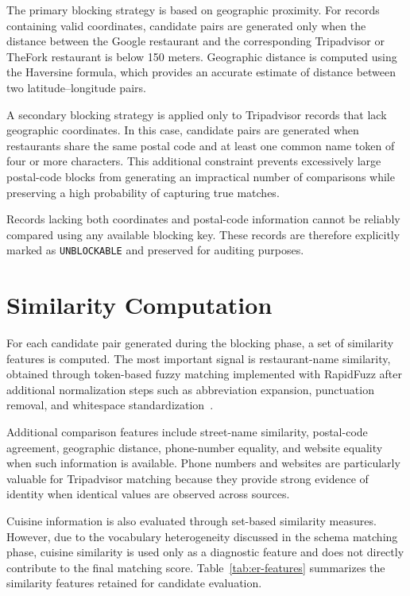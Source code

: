 The primary blocking strategy is based on geographic proximity. For records containing valid coordinates, candidate pairs are generated only when the distance between the Google restaurant and the corresponding Tripadvisor or TheFork restaurant is below 150 meters. Geographic distance is computed using the Haversine formula, which provides an accurate estimate of distance between two latitude--longitude pairs.

A secondary blocking strategy is applied only to Tripadvisor records that lack geographic coordinates. In this case, candidate pairs are generated when restaurants share the same postal code and at least one common name token of four or more characters. This additional constraint prevents excessively large postal-code blocks from generating an impractical number of comparisons while preserving a high probability of capturing true matches.

Records lacking both coordinates and postal-code information cannot be reliably compared using any available blocking key. These records are therefore explicitly marked as \texttt{UNBLOCKABLE} and preserved for auditing purposes.

\section{Similarity Computation}

For each candidate pair generated during the blocking phase, a set of similarity features is computed. The most important signal is restaurant-name similarity, obtained through token-based fuzzy matching implemented with RapidFuzz after additional normalization steps such as abbreviation expansion, punctuation removal, and whitespace standardization~\cite{rapidfuzz-geopy}.

Additional comparison features include street-name similarity, postal-code agreement, geographic distance, phone-number equality, and website equality when such information is available. Phone numbers and websites are particularly valuable for Tripadvisor matching because they provide strong evidence of identity when identical values are observed across sources.

Cuisine information is also evaluated through set-based similarity measures. However, due to the vocabulary heterogeneity discussed in the schema matching phase, cuisine similarity is used only as a diagnostic feature and does not directly contribute to the final matching score. Table~\ref{tab:er-features} summarizes the similarity features retained for candidate evaluation.

